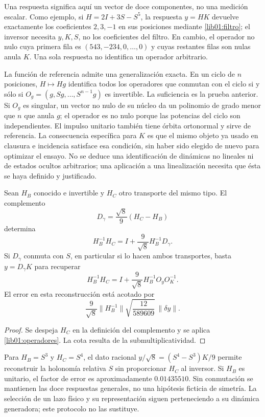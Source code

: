 Una respuesta significa aquí un vector de doce componentes, no una
medición escalar. Como ejemplo, si \(H=2I+3S-S^5\), la respuesta
\(y=HK\) devuelve exactamente los coeficientes \(2,3,-1\) en sus
posiciones mediante \eqref{lib01:filtro}; el inversor necesita \(y,K,S\),
no los coeficientes del filtro. En cambio, el operador no nulo cuya primera
fila es \((543,-234,0,\ldots,0)\) y cuyas restantes filas son nulas
anula \(K\). Una sola respuesta no identifica un operador arbitrario.

La función de referencia admite una generalización exacta. En un ciclo de
\(n\) posiciones, \(H\mapsto Hg\) identifica todos los operadores
que conmutan con el ciclo si y sólo si
\(O_g=(g,Sg,\ldots,S^{n-1}g)\) es invertible. La suficiencia es la
prueba anterior. Si \(O_g\) es singular, un vector no nulo de su núcleo
da un polinomio de grado menor que \(n\) que anula \(g\); el operador
es no nulo porque las potencias del ciclo son independientes. El impulso
unitario también tiene órbita ortonormal y sirve de referencia. La
consecuencia específica para \(K\) es que el mismo objeto ya usado en
clausura e incidencia satisface esa condición, sin haber sido elegido de
nuevo para optimizar el ensayo. No se deduce una identificación de
dinámicas no lineales ni de estados ocultos arbitrarios; una aplicación a
una linealización necesita que ésta se haya definido y justificado.

\begin{corollary}
\label{lib01:holonomia}
Sean \(H_B\) conocido e invertible y \(H_C\) otro transporte del
mismo tipo. El complemento
\[
 D_\gamma=\frac{\sqrt8}{9}(H_C-H_B)
\]
determina
\[
 H_B^{-1}H_C=I+\frac9{\sqrt8}H_B^{-1}D_\gamma.
\]
Si \(D_\gamma\) conmuta con \(S\), en particular si lo hacen ambos
transportes, basta \(y=D_\gamma K\) para recuperar
\begin{equation}
 H_B^{-1}H_C
 =I+\frac9{\sqrt8}H_B^{-1}O_yO_K^{-1}.
 \label{lib01:holonomia-una-respuesta}
\end{equation}
El error en esta reconstrucción está acotado por
\[
 \frac9{\sqrt8}\|H_B^{-1}\|
 \sqrt{\frac{12}{589609}}\,\|\delta y\|.
\]
\end{corollary}
\begin{proof}
Se despeja \(H_C\) en la definición del complemento y se aplica
\cref{lib01:operadores}. La cota resulta de la submultiplicatividad.
\end{proof}

Para \(H_B=S^3\) y \(H_C=S^4\), el dato racional
\(y/\sqrt8=(S^4-S^3)K/9\) permite reconstruir la holonomía relativa
\(S\) sin proporcionar \(H_C\) al inversor. Si \(H_B\) es
unitario, el factor de error es aproximadamente \(0.01435510\). Sin
conmutación se mantienen las doce respuestas generales, no una hipótesis
ficticia de simetría. La selección de un lazo físico y su representación
siguen perteneciendo a su dinámica generadora; este protocolo no las
sustituye.

